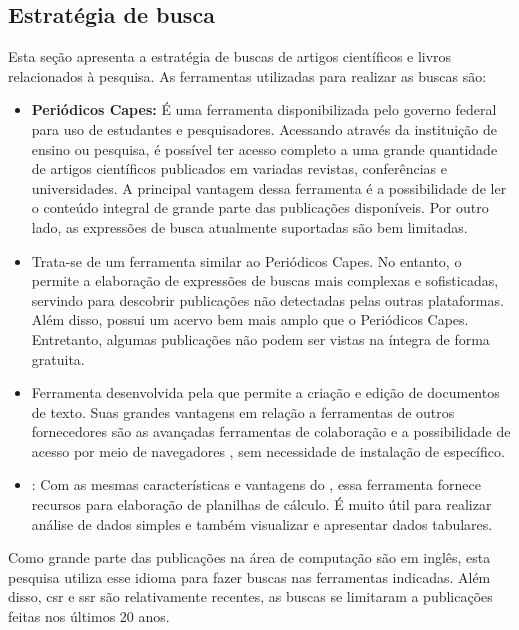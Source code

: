 \subsection{Estratégia de busca}
Esta seção apresenta a estratégia de buscas de artigos científicos e livros relacionados à pesquisa. As ferramentas utilizadas para realizar as buscas são:
\begin{itemize}
    \item \textbf{Periódicos Capes:} É uma ferramenta disponibilizada pelo governo federal para uso de estudantes e pesquisadores. Acessando através da instituição de ensino ou pesquisa, é possível ter acesso completo a uma grande quantidade de artigos científicos publicados em variadas revistas, conferências e universidades. A principal vantagem dessa ferramenta é a possibilidade de ler o conteúdo integral de grande parte das publicações disponíveis. Por outro lado, as expressões de busca atualmente suportadas são bem limitadas.
    \item \textbf{} Trata-se de um ferramenta similar ao Periódicos Capes. No entanto, o  permite a elaboração de expressões de buscas mais complexas e sofisticadas, servindo para descobrir publicações não detectadas pelas outras plataformas. Além disso, possui um acervo bem mais amplo que o Periódicos Capes. Entretanto, algumas publicações não podem ser vistas na íntegra de forma gratuita.
    \item \textbf{} Ferramenta desenvolvida pela  que permite a criação e edição de documentos de texto. Suas grandes vantagens em relação a ferramentas de outros fornecedores são as avançadas ferramentas de colaboração e a possibilidade de acesso por meio de navegadores , sem necessidade de instalação de  específico.
    \item \textbf{}: Com as mesmas características e vantagens do , essa ferramenta fornece recursos para elaboração de planilhas de cálculo. É muito útil para realizar análise de dados simples e também visualizar e apresentar dados tabulares.
\end{itemize}

Como grande parte das publicações na área de computação são em inglês, esta pesquisa utiliza esse idioma para fazer buscas nas ferramentas indicadas. Além disso, \acrfull{csr} e \acrfull{ssr} são relativamente recentes, as buscas se limitaram a publicações feitas nos últimos 20 anos.


